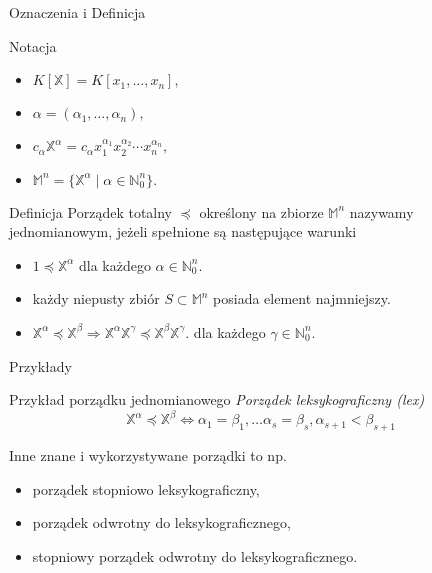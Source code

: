 \documentclass{beamer}
\begin{document}
\begin{frame}{Oznaczenia i Definicja}
    \begin{alertblock}{Notacja}
        \begin{itemize}
            \item $K[\mathbb{X}] = K [x_1, \ldots, x_n],$
            \item $\alpha = (\alpha_1, \ldots, \alpha_n),$
            \item $c_{\alpha} \mathbb{X}^{\alpha} = c_{\alpha} x_1^{\alpha_1}x_2^{\alpha_2}\cdots x_n^{\alpha_n},$
            \item $\mathbb{M}^n = \{\mathbb{X}^{\alpha} \mid \alpha \in \mathbb{N}^n_{0}\}.$
        \end{itemize}
    \end{alertblock}
    \pause 
    \begin{block}{Definicja}
        Porządek totalny $\preceq$ określony na zbiorze $\mathbb{M}^n$ nazywamy \alert{jednomianowym}, jeżeli spełnione są następujące warunki 
        \begin{itemize}
            \item $1 \preceq \mathbb{X}^{\alpha}$ dla każdego $\alpha \in \mathbb{N}^n_{0}.$
            \item każdy niepusty zbiór $S \subset \mathbb{M}^n$ posiada element najmniejszy.
            \item $\mathbb{X}^{\alpha} \preceq \mathbb{X}^{\beta} \Rightarrow \mathbb{X}^{\alpha}\mathbb{X}^{\gamma} \preceq \mathbb{X}^{\beta}\mathbb{X}^{\gamma}.$ dla każdego $\gamma \in \mathbb{N}^{n}_{0}.$
        \end{itemize}
    \end{block}
\end{frame}

\begin{frame}{Przykłady}
    \begin{exampleblock}{Przykład porządku jednomianowego}
            \textit{Porządek leksykograficzny (lex)} 
            $$ \mathbb{X}^{\alpha} \preceq \mathbb{X}^{\beta} \Leftrightarrow \alpha_1 = \beta_1, \ldots \alpha_s = \beta_s, \alpha_{s+1} < \beta_{s+1}$$
    \end{exampleblock}
    \pause 
    Inne znane i wykorzystywane porządki to np.
    \begin{itemize}
        \item porządek stopniowo leksykograficzny,
        \item porządek odwrotny do leksykograficznego,
        \item stopniowy porządek odwrotny do leksykograficznego.
    \end{itemize}
\end{frame}
\end{document}
